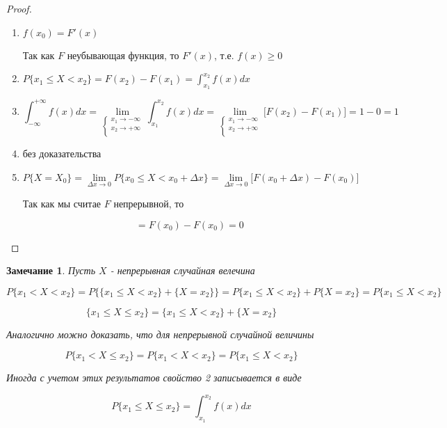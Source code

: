 \documentclass[a4paper, 14pt]{report}
\newtheorem{note}{Замечание}[chapter]
\begin{document}
\begin{proof}
    \begin{enumerate}
        \item $f(x_0) = F'(x)$

            Так как $F$ неубывающая функция, то $F'(x)$, т.е. $f(x) \geq 0$

        \item $P\{x_1 \le X < x_2\} = F(x_2) - F(x_1) = \int_{x_1}^{x_2} f(x) dx$

        \item 
            $$
            \int_{-\infty}^{+\infty} f(x) dx = \lim_{
            \begin{cases}
                x_1 \to -\infty \\
                x_2 \to + \infty \\
            \end{cases}
        } \int_{x_1}^{x_2} f(x) dx = \lim_{
            \begin{cases}
                x_1 \to -\infty \\
                x_2 \to + \infty \\
            \end{cases}
        } \big[ F(x_2) - F(x_1) \big] = 1-0 = 1
            $$

        \item без доказательства

        \item 
            $$
            P\{X=X_0\} = \lim_{\Delta x \to 0} P\{x_0 \le X < x_0 + \Delta x\} =
            \lim_{\Delta x \to 0} \big[ F(x_0 + \Delta x) - F(x_0) \big]
            $$

            Так как мы считае $F$ непрерывной, то

            $$
            = F(x_0) - F(x_0) = 0
            $$
    \end{enumerate}
\end{proof}

\begin{note}
    Пусть $X$ - непрерывная случайная велечина

    $$
    P\{x_1 < X < x_2\} =
    P\{\{ x_1 \le X < x_2\} + \{X=x_2\}\} = P\{x_1 \le X < x_2\} + P\{X=x_2\} = P\{x_1 \le X < x_2\}
    $$

    $$
    \{x_1 \le X \le x_2\} = \{x_1 \le X < x_2\} + \{X = x_2\}
    $$

    Аналогично можно доказать, что для непрерывной случайной величины

    $$
    P\{ x_1 < X \le x_2\} = P\{x_1 < X < x_2\} = P\{x_1 \le X < x_2\}
    $$

    Иногда с учетом этих результатов свойство 2 записывается в виде

    $$
    P\{x_1 \le X \le x_2\} = \int_{x_1}^{x_2} f(x) dx
    $$
\end{note}
\end{document}
